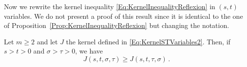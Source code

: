 Now we rewrite the kernel inequality \eqref{Eq:KernelInequalityReflexion} in $(s,t)$ variables. We
do not present a proof of this result since it is identical to the one of
Proposition~\ref{Prop:KernelInequalityReflexion} but changing the notation.

\begin{lemma}
\label{Lemma:KernelInequalityCone} Let $m\geq 2$ and let $J$ the kernel defined in
\eqref{Eq:KernelSTVariables2}. Then, if $s>t>0$ and $\sigma > \tau>0$, we have 
\begin{equation*}
J(s,t,\sigma, \tau) \geq J(s,t,\tau, \sigma)\,.
\end{equation*}
\end{lemma}

